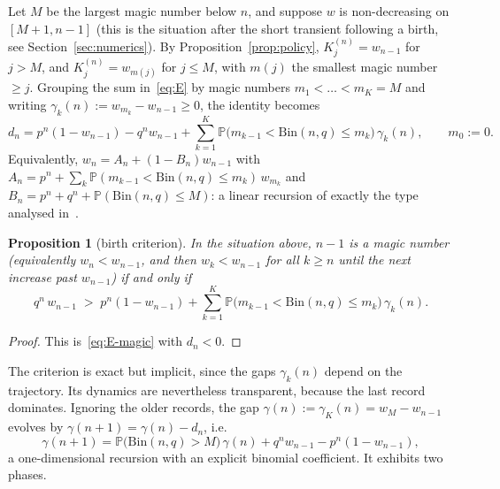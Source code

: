 \documentclass[11pt]{article}
\newtheorem{proposition}[theorem]{Proposition}
\theoremstyle{definition}
\newcommand{\Bin}{\mathrm{Bin}}
\newcommand{\Prob}{\mathbb{P}}
\begin{document}
Let $M$ be the largest magic number below $n$, and suppose $w$ is
non-decreasing on $[M+1,n-1]$ (this is the situation after the short
transient following a birth, see Section~\ref{sec:numerics}).  By
Proposition~\ref{prop:policy}, $K^{(n)}_j=w_{n-1}$ for $j>M$, and
$K^{(n)}_j=w_{m(j)}$ for $j\le M$, with $m(j)$ the smallest magic
number $\ge j$.  Grouping the sum
in~\eqref{eq:E} by magic numbers $m_1<\dots<m_K=M$ and writing
$\gamma_k(n):=w_{m_k}-w_{n-1}\ge0$, the identity becomes
\begin{equation}\label{eq:E-magic}
  d_n=p^{n}(1-w_{n-1})-q^{n}w_{n-1}
      +\sum_{k=1}^{K}\Prob\bigl(m_{k-1}<\Bin(n,q)\le m_k\bigr)\,\gamma_k(n),
  \qquad m_0:=0 .
\end{equation}
Equivalently, $w_n=A_n+(1-B_n)w_{n-1}$ with
$A_n=p^{n}+\sum_k\Prob(m_{k-1}<\Bin(n,q)\le m_k)\,w_{m_k}$ and
$B_n=p^{n}+q^{n}+\Prob(\Bin(n,q)\le M)$: a linear recursion of exactly
the type analysed in~\cite[\S3.1 and \S4]{Paper1}.

\begin{proposition}[birth criterion]\label{prop:birth}
  In the situation above, $n-1$ is a magic number (equivalently
  $w_n<w_{n-1}$, and then $w_k<w_{n-1}$ for all $k\ge n$ until the next
  increase past $w_{n-1}$) if and only if
  \begin{equation}\label{eq:birth}
    q^{n}\,w_{n-1}\;>\;p^{n}(1-w_{n-1})
      +\sum_{k=1}^{K}\Prob\bigl(m_{k-1}<\Bin(n,q)\le m_k\bigr)\,\gamma_k(n).
  \end{equation}
\end{proposition}

\begin{proof}
  This is~\eqref{eq:E-magic} with $d_n<0$.
\end{proof}

The criterion is exact but implicit, since the gaps $\gamma_k(n)$
depend on the trajectory.  Its dynamics are nevertheless transparent,
because the last record dominates.  Ignoring the older records, the gap
$\gamma(n):=\gamma_K(n)=w_M-w_{n-1}$ evolves by
$\gamma(n+1)=\gamma(n)-d_n$, i.e.
\begin{equation}\label{eq:gap-rec}
  \gamma(n+1)=\Prob\bigl(\Bin(n,q)>M\bigr)\,\gamma(n)
              +q^{n}w_{n-1}-p^{n}(1-w_{n-1}) ,
\end{equation}
a one-dimensional recursion with an explicit binomial coefficient.
It exhibits two phases.
\end{document}
